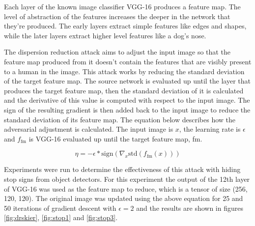 \documentclass{article}
\begin{document}
Each layer of the known image classifier  VGG-16 produces a feature map. The level of abstraction of the features increases the deeper in the network that they're produced. The early layers extract simple features like edges and shapes, while the later layers extract higher level features like a dog's nose. \cite{olah2017feature}

The dispersion reduction attack aims to adjust the input image so that the feature map produced from it doesn't contain the features that are visibly present to a human in the image. This attack works by reducing the standard deviation of the target feature map. The source network is evaluated up until the layer that produces the target feature map, then the standard deviation of it is calculated and the derivative of this value is computed with respect to the input image. The sign of the resulting gradient is then added back to the input image to reduce the standard deviation of its feature map. The equation below describes how the adversarial adjustment is calculated. The input image is $x$, the learning rate is $\epsilon$ and $f_{\text{fm}}$ is VGG-16 evaluated up until the target feature map, fm.

\begin{equation}
    \eta = - \epsilon * \text{sign}(\nabla_x \text{std}(f_{\text{fm}}(x)))
\end{equation}

Experiments were run to determine the effectiveness of this attack with hiding stop signs from object detectors. For this experiment the output of the 12th layer of VGG-16 was used as the feature map to reduce, which is a tensor of size (256, 120, 120). The original image was updated using the above equation for 25 and 50 iterations of gradient descent with $\epsilon = 2$ and the results are shown in figures \ref{fig:drskier}, \ref{fig:stop1} and \ref{fig:stop3}.
\end{document}

